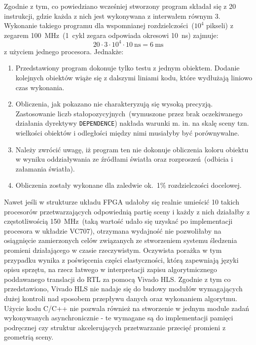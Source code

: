 Zgodnie z tym, co powiedziano wcześniej stworzony program składał się z 20 instrukcji, gdzie każda z nich jest wykonywana z interwałem równym 3. Wykonanie takiego programu dla wspomnianej rozdzielczości~($10^4$ pikseli) z zegarem 100~MHz~(1~cykl zegara odpowiada okresowi 10~ns) zajmuje:
\begin{equation}
20\cdot 3 \cdot 10^4 \cdot 10\ \mathrm{ns} = 6\ \mathrm{ms}
\end{equation}
z użyciem jednego procesora. Jednakże:
\begin{enumerate}
\item Przedstawiony program dokonuje tylko testu z jednym obiektem. Dodanie kolejnych obiektów wiąże się z dalszymi liniami kodu, które wydłużają liniowo czas wykonania.
\item Obliczenia, jak pokazano nie charakteryzują się wysoką precyzją. Zastosowanie liczb stałopozycyjnych~(wymuszone przez brak oczekiwanego działania dyrektywy \texttt{DEPENDENCE}) nakłada warunki m. in. na skalę sceny tzn. wielkości obiektów i odległości między nimi musiałyby być porównywalne.
\item Należy zwrócić uwagę, iż program ten nie dokonuje obliczenia koloru obiektu w wyniku oddziaływania ze źródłami światła oraz rozproszeń~(odbicia i załamania światła).
\item Obliczenia zostały wykonane dla zaledwie ok.~1\% rozdzielczości docelowej.
\end{enumerate}
Nawet jeśli w strukturze układu FPGA udałoby się realnie umieścić 10 takich procesorów przetwarzających odpowiednią partię sceny i każdy z nich działałby z częstotliwością 150~MHz~(taką wartość udało się uzyskać po implementacji procesora w układzie VC707), otrzymana wydajność nie pozwoliłaby na osiągnięcie zamierzonych celów związanych ze stworzeniem systemu śledzenia promieni działającego w czasie rzeczywistym. Oczywista porażka w tym przypadku wynika z poświęcenia części elastyczności, którą zapewniają języki opisu sprzętu, na rzecz łatwego w interpretacji zapisu algorytmicznego poddawanego translacji do RTL za pomocą Vivado HLS. Zgodnie z tym co przedstawiono, Vivado HLS nie nadaje się do budowy modułów wymagających dużej kontroli nad sposobem przepływu danych oraz wykonaniem algorytmu. Użycie kodu C/C++ nie pozwala również na stworzenie w jednym module zadań wykonywanych asynchronicznie - te wymagane są do implementacji pamięci podręcznej czy struktur akcelerujących przetwarzanie przecięć promieni z geometrią sceny.

